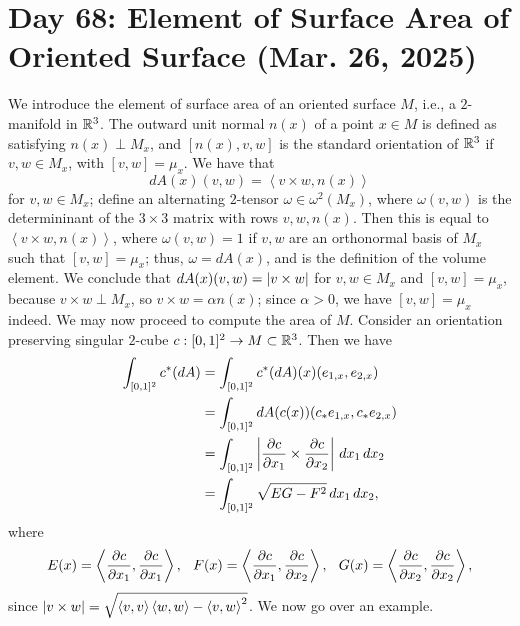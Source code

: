 \section{Day 68: Element of Surface Area of Oriented Surface (Mar. 26, 2025)}
We introduce the element of surface area of an oriented surface $M$, i.e., a $2$-manifold in $\mathbb R^3$. The outward unit normal $n(x)$ of a point $x \in M$ is defined as satisfying $n(x) \perp M_x$, and $[n(x), v, w]$ is the standard orientation of $\mathbb R^3$ if $v, w \in M_x$, with $[v, w] = \mu_x$. We have that
\[ dA(x)(v, w) = \left<v \times w, n(x)\right> \]
for $v, w \in M_x$; define an alternating $2$-tensor $\omega \in \omega^2(M_x)$, where $\omega(v, w)$ is the determininant of the $3 \times 3$ matrix with rows $v, w, n(x)$. Then this is equal to $\left<v \times w, n(x)\right>$, where $\omega(v, w) = 1$ if $v, w$ are an orthonormal basis of $M_x$ such that $[v, w] = \mu_x$; thus, $\omega = dA(x)$, and is the definition of the volume element. We conclude that $dA(x)(v, w) = \left\lvert v \times w \right\rvert$ for $v, w \in M_x$ and $[v, w] = \mu_x$, because $v \times w \perp M_x$, so $v \times w = \alpha n(x)$; since $\alpha > 0$, we have $[v, w] = \mu_x$ indeed.
\medskip\newline
We may now proceed to compute the area of $M$. Consider an orientation preserving singular $2$-cube $c : [0, 1]^2 \to M \subset \mathbb R^3$. Then we have
\begin{align*}
    \int_{[0, 1]^2} c^\ast(dA) &= \int_{[0, 1]^2} c^\ast(dA)(x)(e_{1,x}, e_{2,x}) \\
    &= \int_{[0, 1]^2} dA(c(x)) (c_\ast e_{1,x}, c_\ast e_{2,x}) \\
    &= \int_{[0, 1]^2} \left\lvert \frac{\partial c}{\partial x_1} \times \frac{\partial c}{\partial x_2} \right\rvert \, dx_1 \, dx_2 \\
    &= \int_{[0, 1]^2} \sqrt{EG - F^2} \, dx_1 \, dx_2,
\end{align*}
where
\[ E(x) = \left<\frac{\partial c}{\partial x_1}, \frac{\partial c}{\partial x_1}\right>, \hspace{0.1in} F(x) = \left<\frac{\partial c}{\partial x_1}, \frac{\partial c}{\partial x_2}\right>, \hspace{0.1in} G(x) = \left<\frac{\partial c}{\partial x_2}, \frac{\partial c}{\partial x_2}\right>, \]
since $\left\lvert v \times w \right\rvert = \sqrt{\left<v, v\right> \left<w, w\right> - \left<v, w\right>^2}$. We now go over an example.
